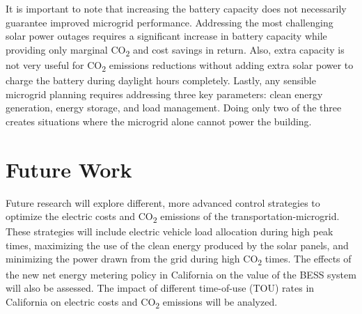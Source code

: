 \documentclass[conference,  usletter]{IEEEtran}
\begin{document}
It is important to note that increasing the battery capacity does not necessarily guarantee improved microgrid performance. Addressing the most challenging solar power outages requires a significant increase in battery capacity while providing only marginal CO\textsubscript{2} and cost savings in return. Also, extra capacity is not very useful for CO\textsubscript{2} emissions reductions without adding extra solar power to charge the battery during daylight hours completely. Lastly, any sensible microgrid planning requires addressing three key parameters: clean energy generation, energy storage, and load management. Doing only two of the three creates situations where the microgrid alone cannot power the building.
\section{Future Work}
Future research will explore different, more advanced control strategies to optimize the electric costs and CO\textsubscript{2} emissions of the transportation-microgrid. These strategies will include electric vehicle load allocation during high peak times, maximizing the use of the clean energy produced by the solar panels, and minimizing the power drawn from the grid during high CO\textsubscript{2} times. The effects of the new net energy metering policy in California on the value of the BESS system will also be assessed. The impact of different time-of-use (TOU) rates in California on electric costs and CO\textsubscript{2} emissions will be analyzed.


		
		
	
\end{document}
